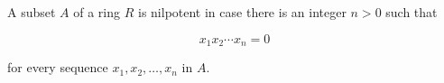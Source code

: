 A subset $A$ of a ring $R$ is nilpotent in case there is an integer $n > 0$ such that

$$x_1 x_2 \cdots x_n = 0$$

for every sequence $x_1, x_2, \ldots, x_n$ in $A$.
